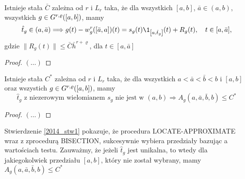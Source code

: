 \documentclass[oik, pdftex, robocza, man]{mgrwms}
\begin{document}
    \begin{cor}
        Istnieje stała $\bar{C}$ zależna od $r$ i $L_{r}$ taka, że dla wszystkich $[a,b]$, $\bar{a} \in (a,b)$, wszystkich $g \in G^{r,\varrho}([a,b])$, mamy
        \begin{equation*}
            \hat{t}_{g} \in (a,\bar{a}) \Longrightarrow g(t)-w_{g}^{r}([\bar{a},a])(t)=s_{g}(t) \1_{\left[a,\hat{t}_{g}\right]}(t)+R_{g}(t), \quad t \in[a,\bar{a}],
        \end{equation*}
        gdzie $\| R_{g}(t) \| \leq \bar{C}\bar{h}^{r+\varrho}$, dla $t \in [a,\bar{a}]$
    \end{cor}
    \begin{proof}
        $(\dots)$
    \end{proof}

    \begin{stw}
        \label{2014_stw1}
        Istnieje stała $C^{*}$ zależna od $r$ i $L_{r}$ taka, że dla wszystkich $a < \bar{a} < \bar{b} < b$ i $[a,b]$ oraz wszystich $g \in G^{r,\varrho}([a,b])$, mamy
        \begin{equation*}
            \hat{t}_{g} \text{ z niezerowym wielomianem } s_{g} \text{ nie jest w } (a,b) \Longrightarrow A_{g}(a, \bar{a}, \bar{b}, b) \leq C^{*}
        \end{equation*}
    \end{stw}
    \begin{proof}
        $(\dots)$
    \end{proof}

    \begin{uw}
        Stwierdzenie \ref{2014_stw1} pokazuje, że procedura LOCATE-APPROXIMATE wraz z zprocedurą BISECTION, sukcesywnie wybiera przedziały bazując a wartościach testu. Zauważmy, że jeżeli $\hat{t}_{g}$ jest unikalna, to wtedy dla jakiegokolwiek przedziału $[a,b]$, który nie został wybrany, mamy $A_{g}(a, \bar{a}, \bar{b}, b) \leq C^{*}$
    \end{uw}
\end{document}
